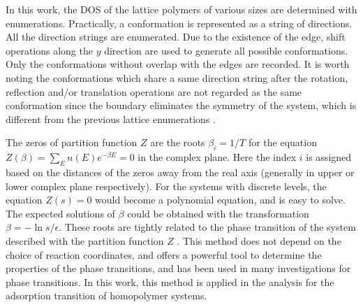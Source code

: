 \documentclass[aps,pre,twocolumn,showpacs,preprintnumbers,amsmath,amssymb]{revtex4-1}
\begin{document}
In this work, the DOS of the lattice polymers of various sizes are
determined with enumerations. Practically, a conformation is represented
as a string of directions. All the direction strings are enumerated.
Due to the existence of the edge, shift operations along the $y$ direction
are used to generate all possible conformations. Only the conformations
without overlap with the edges
are recorded. It is worth noting the conformations which share a same
direction string after the rotation, reflection and/or translation operations are not
regarded as the same conformation since the boundary eliminates the
symmetry of the system, which is different from the previous lattice
enumerations \cite{CieplakPRL98,PandePRL96}.


The zeros of partition function $Z$ are the roots $\beta_i=1/T$
for the equation $Z(\beta)=\sum_E n(E)e^{-\beta E}=0$ in the complex plane.
Here the index $i$ is assigned based on the distances of the zeros away
from the real axis (generally in upper or lower complex plane respectively).
For the systems with discrete levels, the equation $Z(s)=0$ would become
a polynomial equation, and is easy to solve. The expected solutions of
$\beta$ could be obtained with the transformation $\beta=-\ln s/\epsilon$.
These roots are tightly related to the phase transition
of the system described with the partition function $Z$ \cite{LYPR52,FisherBook}.
This method does not depend on the choice of reaction coordinates, and offers
a powerful tool to determine the properties of the phase transitions, and has been
used in many investigations for phase transitions\cite{LipowskiIJMPB05,JCP10b,
HansmannPRL00,HansmannPA01,WangJCP03,ChenPA05}. In this work, this
method is applied in the analysis for the adsorption transition of homopolymer
systems.
\end{document}
